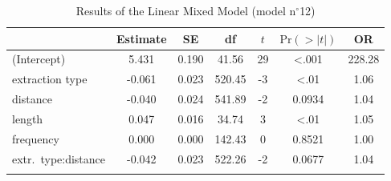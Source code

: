 \begin{table}
\begin{tabularx}{\textwidth}{Q 
                  S[table-format=-1.3] 
                  S[table-format=1.3] 
                  S[table-format=3.2] 
                  S[table-format=-1] 
                  S[table-format=<1.4] 
                  S[table-format=3.2]}
  \lsptoprule
 & {Estimate} & {SE} & {df} & {$t$} & {$\text{Pr}(>|t|)$} & {OR} \\ 
  \midrule
(Intercept) & 5.431 & 0.190 & 41.56 & 29 & <.001 & 228.28 \\ 
  extraction type & -0.061 & 0.023 & 520.45 & -3 & <.01 & 1.06 \\ 
  distance & -0.040 & 0.024 & 541.89 & -2 & 0.0934 & 1.04 \\ 
  length & 0.047 & 0.016 & 34.74 & 3 & <.01 & 1.05 \\ 
  frequency & 0.000 & 0.000 & 142.43 & 0 & 0.8521 & 1.00 \\ 
  extr.\ type:distance & -0.042 & 0.023 & 522.26 & -2 & 0.0677 & 1.04 \\ 
   \lspbottomrule
\end{tabularx}
\caption{Results of the Linear Mixed Model (model n$^{\circ}$12)}
\label{tab:exp03-m12}
\end{table}
